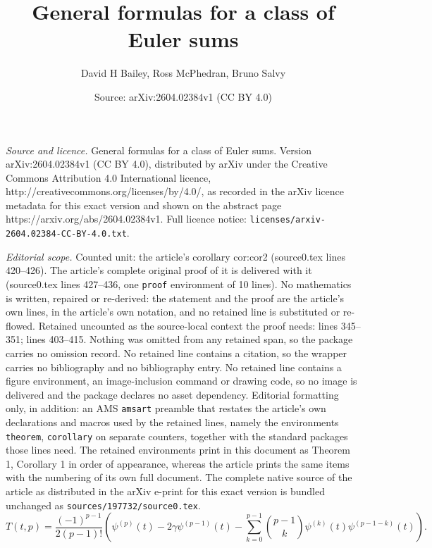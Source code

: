 \documentclass[10pt,a4paper]{amsart}
\title{General formulas for a class of Euler sums}
\author{David H Bailey, Ross McPhedran, Bruno Salvy}
\date{Source: arXiv:2604.02384v1 (CC BY 4.0)}
\begin{document}
\maketitle

\noindent\emph{Source and licence.} General formulas for a class of Euler sums. Version arXiv:2604.02384v1 (CC BY 4.0), distributed by arXiv under the Creative Commons Attribution 4.0 International licence, http://creativecommons.org/licenses/by/4.0/, as recorded in the arXiv licence metadata for this exact version and shown on the abstract page https://arxiv.org/abs/2604.02384v1. Full licence notice: \texttt{licenses/arxiv-2604.02384-CC-BY-4.0.txt}.\par\smallskip

\noindent\textit{Editorial scope.} Counted unit: the article's corollary cor:cor2 (source0.tex lines 420--426). The article's complete original proof of it is delivered with it (source0.tex lines 427--436, one \texttt{proof} environment of 10 lines). No mathematics is written, repaired or re-derived: the statement and the proof are the article's own lines, in the article's own notation, and no retained line is substituted or re-flowed.  Retained uncounted as the source-local context the proof needs: lines 345--351; lines 403--415.  Nothing was omitted from any retained span, so the package carries no omission record.  No retained line contains a citation, so the wrapper carries no bibliography and no bibliography entry.  No retained line contains a figure environment, an image-inclusion command or drawing code, so no image is delivered and the package declares no asset dependency.  Editorial formatting only, in addition: an AMS \texttt{amsart} preamble that restates the article's own declarations and macros used by the retained lines, namely the environments \texttt{theorem}, \texttt{corollary} on separate counters, together with the standard packages those lines need.  The retained environments print in this document as Theorem 1, Corollary 1 in order of appearance, whereas the article prints the same items with the numbering of its own full document.  The complete native source of the article as distributed in the arXiv e-print for this exact version is bundled unchanged as \texttt{sources/197732/source0.tex}.
\begin{equation}
T(t,p)=
\frac{(-1)^{p-1}}{2(p-1)!}\left(\psi^{(p)}(t)
-2\gamma\psi^{(p-1)}(t)-\sum_
{k=0}^{p-1} \binom{p-1}{k}\psi^{(k)}(t)\psi^{(p-1-k)}(t)
\right)\label{eq:Ttp}.
\end{equation}
\end{document}
